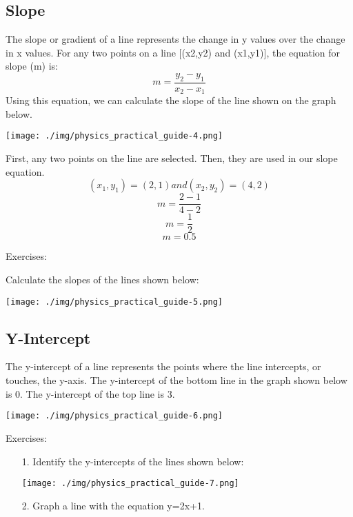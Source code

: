 \subsection{Slope}
The slope or gradient of a line represents the change in y values over the change in x values. For any two points on a line [(x2,y2) and (x1,y1)], the equation for slope (m) is: $$m=\frac{y_2 - y_1}{x_2 - x_1}$$
Using this equation, we can calculate the slope of the line shown on the graph below.

\begin{center}
\texttt{[image: ./img/physics\_practical\_guide-4.png]}
\end{center}

First, any two points on the line are selected. Then, they are used in our slope equation. $$(x_1,y_1 )=(2,1) and (x_2,y_2 )=(4,2)$$
$$m=\frac{2- 1}{4- 2}$$
$$m=\frac{1}{2}$$
$$m=0.5$$

Exercises:

Calculate the slopes of the lines shown below:

\begin{center}
\texttt{[image: ./img/physics\_practical\_guide-5.png]}
\end{center}

\subsection{Y-Intercept}

The y-intercept of a line represents the points where the line intercepts, or touches, the y-axis. The y-intercept of the bottom line in the graph shown below is 0. The y-intercept of the top line is 3. 

\begin{center}
\texttt{[image: ./img/physics\_practical\_guide-6.png]}
\end{center}

Exercises:

\begin{enumerate}
\item[1.] Identify the y-intercepts of the lines shown below:

\begin{center}
\texttt{[image: ./img/physics\_practical\_guide-7.png]}
\end{center}

\item[2.] Graph a line with the equation y=2x+1.
\end{enumerate}

